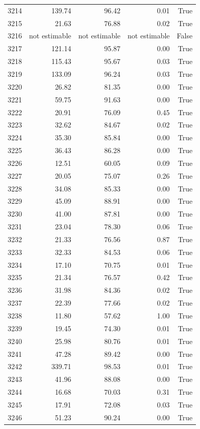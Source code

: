 \begin{longtable}{rrrrr}
3214 & 139.74 & 96.42 & 0.01 & True \\
3215 & 21.63 & 76.88 & 0.02 & True \\
3216 & not estimable & not estimable & not estimable & False \\
3217 & 121.14 & 95.87 & 0.00 & True \\
3218 & 115.43 & 95.67 & 0.03 & True \\
3219 & 133.09 & 96.24 & 0.03 & True \\
3220 & 26.82 & 81.35 & 0.00 & True \\
3221 & 59.75 & 91.63 & 0.00 & True \\
3222 & 20.91 & 76.09 & 0.45 & True \\
3223 & 32.62 & 84.67 & 0.02 & True \\
3224 & 35.30 & 85.84 & 0.00 & True \\
3225 & 36.43 & 86.28 & 0.00 & True \\
3226 & 12.51 & 60.05 & 0.09 & True \\
3227 & 20.05 & 75.07 & 0.26 & True \\
3228 & 34.08 & 85.33 & 0.00 & True \\
3229 & 45.09 & 88.91 & 0.00 & True \\
3230 & 41.00 & 87.81 & 0.00 & True \\
3231 & 23.04 & 78.30 & 0.06 & True \\
3232 & 21.33 & 76.56 & 0.87 & True \\
3233 & 32.33 & 84.53 & 0.06 & True \\
3234 & 17.10 & 70.75 & 0.01 & True \\
3235 & 21.34 & 76.57 & 0.42 & True \\
3236 & 31.98 & 84.36 & 0.02 & True \\
3237 & 22.39 & 77.66 & 0.02 & True \\
3238 & 11.80 & 57.62 & 1.00 & True \\
3239 & 19.45 & 74.30 & 0.01 & True \\
3240 & 25.98 & 80.76 & 0.01 & True \\
3241 & 47.28 & 89.42 & 0.00 & True \\
3242 & 339.71 & 98.53 & 0.01 & True \\
3243 & 41.96 & 88.08 & 0.00 & True \\
3244 & 16.68 & 70.03 & 0.31 & True \\
3245 & 17.91 & 72.08 & 0.03 & True \\
3246 & 51.23 & 90.24 & 0.00 & True \\

\end{longtable}

